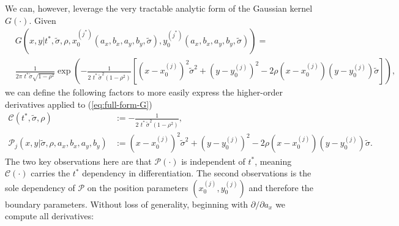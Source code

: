 \documentclass[10pt]{article}
\begin{document}
We can, however, leverage the very tractable analytic form of the
Gaussian kernel $G(\cdot)$. Given
\begin{align}
  & G(x,y | t^{*}, \tilde{\sigma}, \rho, x_0^{(j^*)}(a_x, b_x, a_y, b_y, \tilde{\sigma}),
    y_0^{(j^*)}(a_x, b_x, a_y, b_y, \tilde{\sigma})) = &  \nonumber \\
  & \frac{1}{2\pi\,\, t^{*}\tilde{\sigma}\sqrt{1-\rho^2}} \exp\left( -\frac{1}{2\,\,t^*\, \tilde{\sigma}^2 (1-\rho^2)} \left[ \left(x-x_0^{(j)}\right)^2 \tilde{\sigma}^2 + \left(y-y_0^{(j)}\right)^2 - 2\rho(x-x_0^{(j)})(y-y_0^{(j)})\tilde{\sigma} \right]\right), & \label{eq:full-form-G}
\end{align}
we can define the following factors to more easily express the
higher-order derivatives applied to (\ref{eq:full-form-G})
\begin{align}
  \mathcal{C}(t^*, \tilde{\sigma}, \rho) &:= -\frac{1}{2\,\,t^*\, \tilde{\sigma}^2 (1-\rho^2)}, \\
  \mathcal{P}_j(x,y | \tilde{\sigma}, \rho, a_x,b_x,a_y,b_y) &:= \left(x-x_0^{(j)}\right)^2 \tilde{\sigma}^2 + \left(y-y_0^{(j)}\right)^2 - 2\rho(x-x_0^{(j)})(y-y_0^{(j)})\tilde{\sigma}.
\end{align}
The two key observations here are that $\mathcal{P}(\cdot)$ is
independent of $t^{*}$, meaning $\mathcal{C}(\cdot)$ carries the
$t^{*}$ dependency in differentiation. The second observations is the
sole dependency of $\mathcal{P}$ on the position parameters
$(x_0^{(j)}, y_0^{(j)})$ and therefore the boundary
parameters. Without loss of generality, beginning with
$\partial/\partial a_x$ we compute all derivatives:
\end{document}
